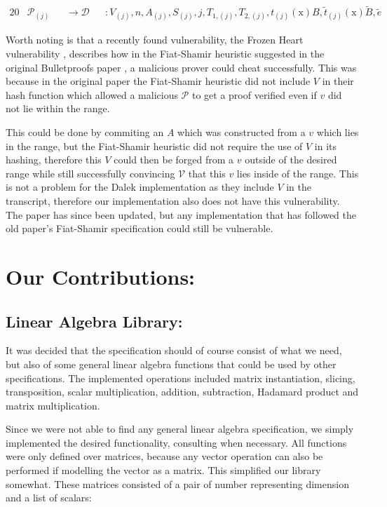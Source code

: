 \documentclass{article}
\newcommand{\eq}[1]{\begin{alignat*}{20}#1\end{alignat*}}
\newcommand{\ran}[1]{\mathrm{#1}}
\newcommand{\V}{\mathcal{V}}
\renewcommand{\P}{\mathcal{P}}
\newcommand{\D}{\mathcal{D}}
\newcommand{\blind}[1]{\widetilde{#1}}
\newcommand{\bt}{\blind{t}}
\newcommand{\bB}{\blind{B}}
\newcommand{\be}{\blind{e}}
\begin{document}
\eq{
	&\P_{(j)} &&\rightarrow \D &&: V_{(j)}, n, A_{(j)}, S_{(j)}, j, T_{1, (j)}, T_{2,(j)}, t_{(j)}(\ran{x})B, \bt_{(j)}(\ran{x})\bB, \be
}

Worth noting is that a recently found vulnerability, the Frozen
Heart vulnerability \cite{frozen-heart}, describes how in the
Fiat-Shamir heuristic suggested in the original Bulletproofs paper
\cite{bulletproofs}, a malicious prover could cheat successfully. This
was because in the original paper the Fiat-Shamir heuristic did not
include $V$ in their hash function which allowed a malicious $\P$
to get a proof verified even if $v$ did not lie within the range.

This could be done by commiting an $A$ which was constructed from
a $v$ which lies in the range, but the Fiat-Shamir heuristic did
not require the use of $V$ in its hashing, therefore this $V$
could then be forged from a $v$ outside of the desired range while
still successfully convincing $\V$ that this $v$ lies inside of the
range. This is not a problem for the Dalek implementation as they
include $V$ in the transcript, therefore our implementation also
does not have this vulnerability. The paper has since been updated,
but any implementation that has followed the old paper's Fiat-Shamir
specification could still be vulnerable.

\section{Our Contributions:} \label{our-contributions}

\subsection{Linear Algebra Library:} \label{linear-algebra-library}
It was decided that the specification should of course consist of what
we need, but also of some general linear algebra functions that could
be used by other specifications. The implemented operations included
matrix instantiation, slicing, transposition, scalar multiplication,
addition, subtraction, Hadamard product and matrix multiplication.

Since we were not able to find any general linear algebra
specification, we simply implemented the desired functionality,
consulting \cite{linear-algebra} when necessary. All functions were
only defined over matrices, because any vector operation can also
be performed if modelling the vector as a matrix. This simplified
our library somewhat. These matrices consisted of a pair of number
representing dimension and a list of scalars:
\end{document}
